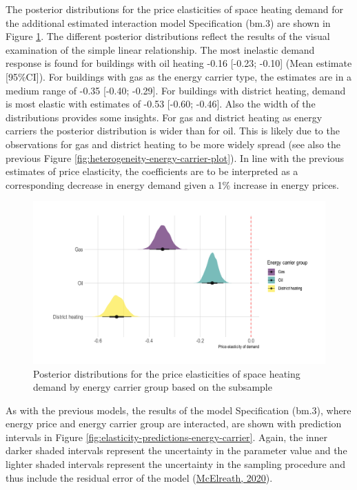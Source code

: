 \documentclass[12pt,twoside]{reedthesis}
\begin{document}
The posterior distributions for the price elasticities of space heating demand for the additional estimated interaction model Specification (bm.3) are shown in Figure \ref{fig:posterior-distribution-interaction}. The different posterior distributions reflect the results of the visual examination of the simple linear relationship. The most inelastic demand response is found for buildings with oil heating -0.16 {[}-0.23; -0.10{]} (Mean estimate {[}95\%CI{]}). For buildings with gas as the energy carrier type, the estimates are in a medium range of -0.35 {[}-0.40; -0.29{]}. For buildings with district heating, demand is most elastic with estimates of -0.53 {[}-0.60; -0.46{]}. Also the width of the distributions provides some insights. For gas and district heating as energy carriers the posterior distribution is wider than for oil. This is likely due to the observations for gas and district heating to be more widely spread (see also the previous Figure \ref{fig:heterogeneity-energy-carrier-plot}). In line with the previous estimates of price elasticity, the coefficients are to be interpreted as a corresponding decrease in energy demand given a 1\% increase in energy prices.
\begin{figure}

{\centering \includegraphics[width=1\linewidth]{figure/posterior-distribution-interaction} 

}

\caption{Posterior distributions for the price elasticities of space heating demand by energy carrier group based on the subsample}\label{fig:posterior-distribution-interaction}
\end{figure}
As with the previous models, the results of the model Specification (bm.3), where energy price and energy carrier group are interacted, are shown with prediction intervals in Figure \ref{fig:elasticity-predictions-energy-carrier}. Again, the inner darker shaded intervals represent the uncertainty in the parameter value and the lighter shaded intervals represent the uncertainty in the sampling procedure and thus include the residual error of the model (\protect\hyperlink{ref-mcelreath20}{McElreath, 2020}).
\end{document}
